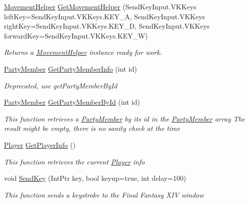 \begin{DoxyCompactItemize}
\item 
\hyperlink{classffxivlib_1_1_movement_helper}{Movement\-Helper} \hyperlink{classffxivlib_1_1_f_f_x_i_v_l_i_b_a889468d923f65d7ae6ac52135048c1d6}{Get\-Movement\-Helper} (Send\-Key\-Input.\-V\-K\-Keys left\-Key=Send\-Key\-Input.\-V\-K\-Keys.\-K\-E\-Y\-\_\-\-A, Send\-Key\-Input.\-V\-K\-Keys right\-Key=Send\-Key\-Input.\-V\-K\-Keys.\-K\-E\-Y\-\_\-\-D, Send\-Key\-Input.\-V\-K\-Keys forward\-Key=Send\-Key\-Input.\-V\-K\-Keys.\-K\-E\-Y\-\_\-\-W)
\begin{DoxyCompactList}\small\item\em Returns a \hyperlink{classffxivlib_1_1_movement_helper}{Movement\-Helper} instance ready for work. \end{DoxyCompactList}\item 
\hyperlink{classffxivlib_1_1_party_member}{Party\-Member} \hyperlink{classffxivlib_1_1_f_f_x_i_v_l_i_b_a4c0f7a81a068c9ff5b668ff22a7e15d4}{Get\-Party\-Member\-Info} (int id)
\begin{DoxyCompactList}\small\item\em Deprecated, use get\-Party\-Member\-By\-Id \end{DoxyCompactList}\item 
\hyperlink{classffxivlib_1_1_party_member}{Party\-Member} \hyperlink{classffxivlib_1_1_f_f_x_i_v_l_i_b_aae35e1fac36dcac4b4c0ad42550f918d}{Get\-Party\-Member\-By\-Id} (int id)
\begin{DoxyCompactList}\small\item\em This function retrieves a \hyperlink{classffxivlib_1_1_party_member}{Party\-Member} by its id in the \hyperlink{classffxivlib_1_1_party_member}{Party\-Member} array The result might be empty, there is no sanity check at the time \end{DoxyCompactList}\item 
\hyperlink{classffxivlib_1_1_player}{Player} \hyperlink{classffxivlib_1_1_f_f_x_i_v_l_i_b_a66e0eb2208e2d9332633ca9476976d53}{Get\-Player\-Info} ()
\begin{DoxyCompactList}\small\item\em This function retrieves the current \hyperlink{classffxivlib_1_1_player}{Player} info \end{DoxyCompactList}\item 
void \hyperlink{classffxivlib_1_1_f_f_x_i_v_l_i_b_ac4d88c5b015e78af8455be0bef6f3aca}{Send\-Key} (Int\-Ptr key, bool keyup=true, int delay=100)
\begin{DoxyCompactList}\small\item\em This function sends a keystroke to the Final Fantasy X\-I\-V window \end{DoxyCompactList}\item 

\end{DoxyCompactItemize}
